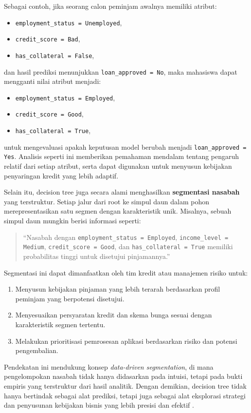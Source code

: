 Sebagai contoh, jika seorang calon peminjam awalnya memiliki atribut:
\begin{itemize}
	\item \texttt{employment\_status = Unemployed},
	\item \texttt{credit\_score = Bad},
	\item \texttt{has\_collateral = False},
\end{itemize}
dan hasil prediksi menunjukkan \texttt{loan\_approved = No}, maka mahasiswa dapat mengganti nilai atribut menjadi:
\begin{itemize}
	\item \texttt{employment\_status = Employed},
	\item \texttt{credit\_score = Good},
	\item \texttt{has\_collateral = True},
\end{itemize}
untuk mengevaluasi apakah keputusan model berubah menjadi \texttt{loan\_approved = Yes}. Analisis seperti ini memberikan pemahaman mendalam tentang pengaruh relatif dari setiap atribut, serta dapat digunakan untuk menyusun kebijakan penyaringan kredit yang lebih adaptif.

Selain itu, decision tree juga secara alami menghasilkan \textbf{segmentasi nasabah} yang terstruktur. Setiap jalur dari root ke simpul daun dalam pohon merepresentasikan satu segmen dengan karakteristik unik. Misalnya, sebuah simpul daun mungkin berisi informasi seperti:

\begin{quote}
	“Nasabah dengan \texttt{employment\_status = Employed}, \texttt{income\_level = Medium}, \texttt{credit\_score = Good}, dan \texttt{has\_collateral = True} memiliki probabilitas tinggi untuk disetujui pinjamannya.”
\end{quote}

Segmentasi ini dapat dimanfaatkan oleh tim kredit atau manajemen risiko untuk:
\begin{enumerate}
	\item Menyusun kebijakan pinjaman yang lebih terarah berdasarkan profil peminjam yang berpotensi disetujui.
	\item Menyesuaikan persyaratan kredit dan skema bunga sesuai dengan karakteristik segmen tertentu.
	\item Melakukan prioritisasi pemrosesan aplikasi berdasarkan risiko dan potensi pengembalian.
\end{enumerate}

Pendekatan ini mendukung konsep \textit{data-driven segmentation}, di mana pengelompokan nasabah tidak hanya didasarkan pada intuisi, tetapi pada bukti empiris yang terstruktur dari hasil analitik. Dengan demikian, decision tree tidak hanya bertindak sebagai alat prediksi, tetapi juga sebagai alat eksplorasi strategi dan penyusunan kebijakan bisnis yang lebih presisi dan efektif \cite{camm2020business}.

